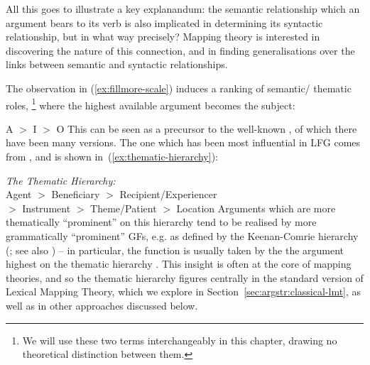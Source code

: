 \documentclass[output=paper]{langscibook}
\begin{document}
\ea
{}\label{ex:good-obliquate}
\label{ex:bad-obliquate}
\z
\z


All this goes to illustrate a key explanandum: the semantic relationship which
an argument bears to its verb is also implicated in determining its syntactic
relationship, but in what way precisely? Mapping theory is interested in
discovering the nature of this connection, and in finding generalisations over
the links between semantic and syntactic relationships.

The observation in (\ref{ex:fillmore-scale}) induces a ranking of semantic\slash
thematic roles,%
%
\footnote{We will use these two terms interchangeably in this chapter, drawing
  no theoretical distinction between them.}
%
where the highest available argument becomes the subject:

\ea
A $>$ I $>$ O
\z
%
This can be seen as a precursor to the well-known 
\citep[43]{jackendoff72}, of which there have been many versions. The one which
has been most influential in LFG comes from \citet[23]{bresnan1989locative}, and
is shown in~(\ref{ex:thematic-hierarchy}):

\ea\label{ex:thematic-hierarchy}
\textit{The Thematic Hierarchy:}\\
Agent $>$ Beneficiary $>$ Recipient\slash Experiencer\\\hfill $>$ Instrument $>$
Theme/Patient $>$ Location%
\z
%
Arguments which are more thematically ``prominent'' on this hierarchy tend to be
realised by more grammatically ``prominent'' GFs, e.g. as defined by the
Keenan-Comrie hierarchy (\citealp{keenan1977noun}; see also
) -- in particular, the \SUBJ function is usually taken by
the the argument highest on the thematic hierarchy \citep{Grimshaw90,speas1990}.
This insight is often at the core of mapping theories, and so the thematic
hierarchy figures centrally in the standard version of Lexical Mapping Theory,
which we explore in Section~\ref{sec:argstr:classical-lmt}, as well as in other
approaches discussed below.
\end{document}

